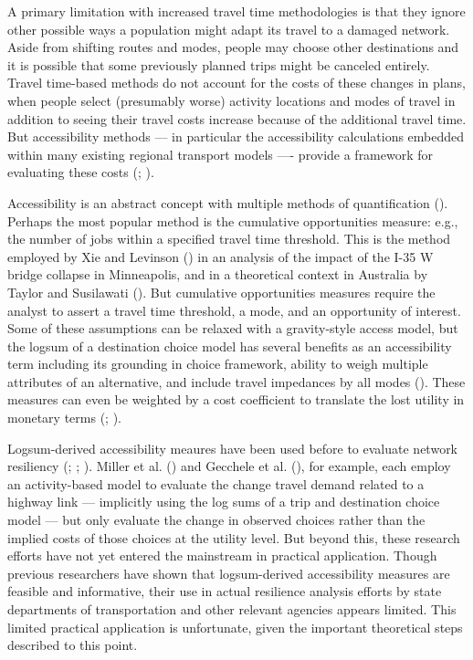 \documentclass[]{ascelike-new}
\begin{document}
A primary limitation with increased travel time methodologies is that
they ignore other possible ways a population might adapt its travel to a
damaged network. Aside from shifting routes and modes, people may choose
other destinations and it is possible that some previously planned trips
might be canceled entirely. Travel time-based methods do not account for
the costs of these changes in plans, when people select (presumably
worse) activity locations and modes of travel in addition to seeing
their travel costs increase because of the additional travel time. But
accessibility methods --- in particular the accessibility calculations
embedded within many existing regional transport models ---- provide a
framework for evaluating these costs
(;
).

Accessibility is an abstract concept with multiple methods of
quantification ().
Perhaps the most popular method is the cumulative opportunities measure:
e.g., the number of jobs within a specified travel time threshold. This
is the method employed by Xie and Levinson
() in an analysis of the impact of the I-35
W bridge collapse in Minneapolis, and in a theoretical context in
Australia by Taylor and Susilawati ().
But cumulative opportunities measures require the analyst to assert a
travel time threshold, a mode, and an opportunity of interest. Some of
these assumptions can be relaxed with a gravity-style access model, but
the logsum of a destination choice model has several benefits as an
accessibility term including its grounding in choice framework, ability
to weigh multiple attributes of an alternative, and include travel
impedances by all modes ().
These measures can even be weighted by a cost coefficient to translate
the lost utility in monetary terms (; ).

Logsum-derived accessibility meaures have been used before to evaluate
network resiliency (;
;
). Miller et al.
() and Gecchele et al.
(), for example, each employ an
activity-based model to evaluate the change travel demand related to a
highway link --- implicitly using the log sums of a trip and destination
choice model --- but only evaluate the change in observed choices rather
than the implied costs of those choices at the utility level. But beyond
this, these research efforts have not yet entered the mainstream in
practical application. Though previous researchers have shown that
logsum-derived accessibility measures are feasible and informative,
their use in actual resilience analysis efforts by state departments of
transportation and other relevant agencies appears limited. This limited
practical application is unfortunate, given the important theoretical
steps described to this point.
\end{document}
